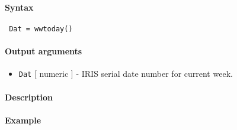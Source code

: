 


	\paragraph{Syntax}
 
 \begin{verbatim}
 Dat = wwtoday()
 \end{verbatim}
 
 \paragraph{Output arguments}
 
 \begin{itemize}
 \item
   \texttt{Dat} {[} numeric {]} - IRIS serial date number for current
   week.
 \end{itemize}
 
 \paragraph{Description}
 
 \paragraph{Example}


